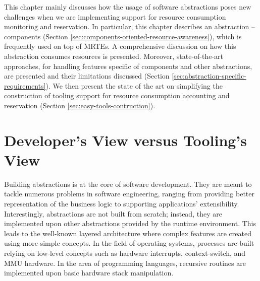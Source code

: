 This chapter mainly discusses how the usage of software abstractions poses new challenges when we are implementing support for resource consumption monitoring and reservation.
In particular, this chapter describes an abstraction -- components (Section \ref{sec:components-oriented-resource-awareness}), which is frequently used on top of MRTEs.
A comprehensive discussion on how this abstraction consumes resources is presented.
Moreover, state-of-the-art approaches, for handling features specific of components and other abstractions, are presented and their limitations discussed (Section \ref{sec:abstraction-specific-requirements}).
We then present the state of the art on simplifying the construction of tooling support for resource consumption accounting and reservation (Section \ref{sec:easy-tools-contruction}).

\section{Developer's View versus Tooling's View} \label{sec:chapter2-introduction}

Building abstractions is at the core of software development.
They are meant to tackle numerous problems in software engineering, ranging from providing better representation of the business logic to supporting applications' extensibility.
Interestingly, abstractions are not built from scratch; instead, they are implemented upon other abstractions provided by the runtime environment.
This leads to the well-known layered architecture where complex features are created using more simple concepts.
In the field of operating systems, processes are built relying on low-level concepts such as hardware interrupts, context-switch, and MMU hardware.
In the area of programming languages, recursive routines are implemented upon basic hardware stack manipulation.

